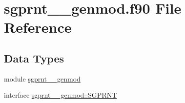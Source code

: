 \hypertarget{sgprnt____genmod_8f90}{\section{sgprnt\+\_\+\+\_\+genmod.\+f90 File Reference}
\label{sgprnt____genmod_8f90}
}
\subsection*{Data Types}
\begin{DoxyCompactItemize}
\item 
module \hyperlink{classsgprnt____genmod}{sgprnt\+\_\+\+\_\+genmod}
\item 
interface \hyperlink{interfacesgprnt____genmod_1_1SGPRNT}{sgprnt\+\_\+\+\_\+genmod\+::\+S\+G\+P\+R\+N\+T}
\end{DoxyCompactItemize}
